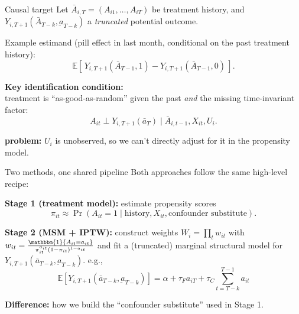 \documentclass[aspectratio=169]{beamer}
\begin{document}
\begin{frame}{Causal target}
Let $\bar A_{i,T}=(A_{i1},\dots,A_{iT})$ be treatment history, and $Y_{i,T+1}(\bar{A}_{T-k},\underbar{a}_{T-k})$ a \emph{truncated} potential outcome.


\vspace{0.2cm}
Example estimand (pill effect in last month, conditional on the past treatment history):
\[
\mathbb{E}\!\left[\,Y_{i,T+1}(\bar A_{T-1},1)-Y_{i,T+1}(\bar A_{T-1},0)\,\right].
\]

\vspace{0.2cm}
\textbf{Key identification condition:}\\
treatment is ``as-good-as-random'' given the past \emph{and} the missing time-invariant factor: 
\[A_{it} \perp Y_{i,T+1}(\bar a_T) \mid \bar A_{i,t-1}, X_{it}, U_i.\]

\textbf{problem:} $U_i$ is unobserved, so we can't directly adjust for it in the propensity model.

\end{frame}

\begin{frame}{Two methods, one shared pipeline}
Both approaches follow the same high-level recipe:

\vspace{0.2cm}
\textbf{Stage 1 (treatment model):}
estimate propensity scores
\[
\pi_{it} \approx \Pr(A_{it}=1 \mid \text{history}, X_{it}, \text{confounder substitute}).
\]

\vspace{0.2cm}
\textbf{Stage 2 (MSM + IPTW):}
construct weights $W_i=\prod_t w_{it}$ with $w_{it} = \frac{\mathbbm{1}\{A_{it} = a_{it}\}}{\pi_{it}^{a_{it}} (1-\pi_{it})^{1-a_{it}}}$ and fit a (truncated) marginal structural 
model for $Y_{i,T+1}(\bar a_{T-k}, \underbar{a}_{T-k})$. e.g.,
\[\mathbb{E}\!\left[Y_{i,T+1}(\bar a_{T-k}, \underbar{a}_{T-k})\right] = \alpha + \tau_F a_{iT} + \tau_C \sum_{t=T-k}^{T-1} a_{it}\]

\vspace{0.3cm}
\textbf{Difference:} how we build the ``confounder substitute'' used in Stage 1.
\end{frame}
\end{document}
